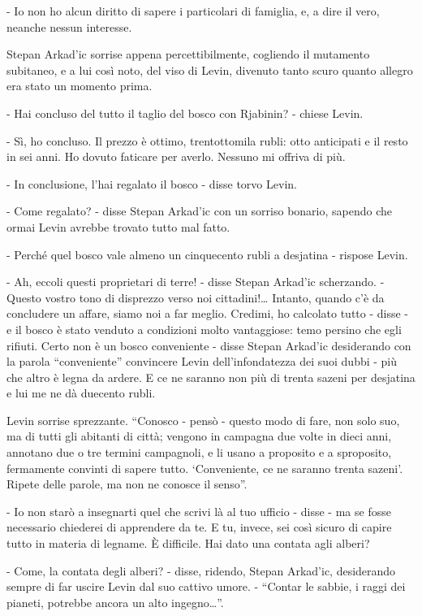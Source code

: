 - Io non ho alcun diritto di sapere i particolari di famiglia, e, a dire il vero, neanche nessun interesse. 

Stepan Arkad'ic sorrise appena percettibilmente, cogliendo il mutamento subitaneo, e a lui così noto, del viso di Levin, divenuto tanto scuro quanto allegro era stato un momento prima. 

- Hai concluso del tutto il taglio del bosco con Rjabinin? - chiese Levin. 

- Sì, ho concluso. Il prezzo è ottimo, trentottomila rubli: otto anticipati e il resto in sei anni. Ho dovuto faticare per averlo. Nessuno mi offriva di più. 

- In conclusione, l'hai regalato il bosco - disse torvo Levin. 

- Come regalato? - disse Stepan Arkad'ic con un sorriso bonario, sapendo che ormai Levin avrebbe trovato tutto mal fatto. 

- Perché quel bosco vale almeno un cinquecento rubli a desjatina - rispose Levin. 

- Ah, eccoli questi proprietari di terre! - disse Stepan Arkad'ic scherzando. - Questo vostro tono di disprezzo verso noi cittadini!\ldots{} Intanto, quando c'è da concludere un affare, siamo noi a far meglio. Credimi, ho calcolato tutto - disse - e il bosco è stato venduto a condizioni molto vantaggiose: temo persino che egli rifiuti. Certo non è un bosco conveniente - disse Stepan Arkad'ic desiderando con la parola ``conveniente'' convincere Levin dell'infondatezza dei suoi dubbi - più che altro è legna da ardere. E ce ne saranno non più di trenta sazeni per desjatina e lui me ne dà duecento rubli. 

Levin sorrise sprezzante. ``Conosco - pensò - questo modo di fare, non solo suo, ma di tutti gli abitanti di città; vengono in campagna due volte in dieci anni, annotano due o tre termini campagnoli, e li usano a proposito e a sproposito, fermamente convinti di sapere tutto. `Conveniente, ce ne saranno trenta sazeni'. Ripete delle parole, ma non ne conosce il senso''. 

- Io non starò a insegnarti quel che scrivi là al tuo ufficio - disse - ma se fosse necessario chiederei di apprendere da te. E tu, invece, sei così sicuro di capire tutto in materia di legname. È difficile. Hai dato una contata agli alberi? 

- Come, la contata degli alberi? - disse, ridendo, Stepan Arkad'ic, desiderando sempre di far uscire Levin dal suo cattivo umore. - ``Contar le sabbie, i raggi dei pianeti, potrebbe ancora un alto ingegno\ldots{}''. 

